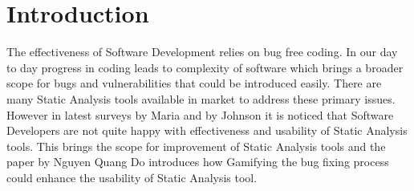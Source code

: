 \chapter{Introduction}
\label{ch:introduction}

The effectiveness of Software Development relies on bug free coding. In our day to day progress in coding leads to complexity of software which brings a broader scope for bugs and vulnerabilities that could be introduced easily. There are many Static Analysis tools available in market to address these primary issues. However in latest surveys by Maria \etal{} \cite{CB16} and by Johnson \etal{} \cite{JSMB13} it is noticed that Software Developers are not quite happy with effectiveness and usability of Static Analysis tools. This brings the scope for improvement of Static Analysis tools and the paper by Nguyen Quang Do \etal{} \cite{NB18} introduces how Gamifying the bug fixing process could enhance the usability of Static Analysis tool.
\\